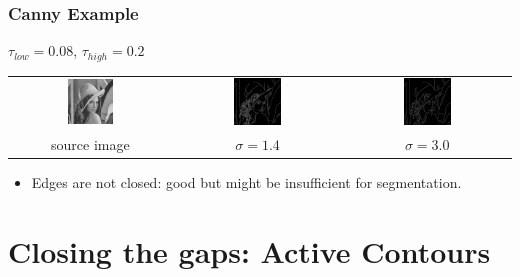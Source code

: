 \documentclass[10pt]{beamer}
\begin{document}
\begin{frame}
  \frametitle{Canny Example}
  $\tau_{low} = 0.08$, $\tau_{high} = 0.2$
  \begin{center}
    \begin{tabular}[h]{ccc}
      \includegraphics[width=0.3\textwidth]{IMAGES/lena} &
      \includegraphics[width=0.3\textwidth]{IMAGES/edgelena1_4_0_2} &
      \includegraphics[width=0.3\textwidth]{IMAGES/edgelena3_0_0_2} \\
      source image & $\sigma=1.4$ & $\sigma=3.0$
    \end{tabular}
  \end{center}
  \begin{itemize}

  \item Edges are not closed: good but might be insufficient for segmentation.
  \end{itemize}
\end{frame}



\section{Closing the gaps: Active Contours}
\end{document}
